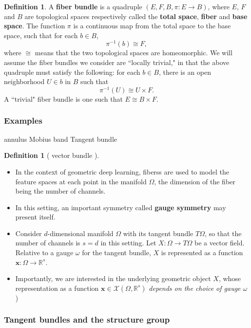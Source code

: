 \documentclass[12pt]{article}
\numberwithin{equation}{section}
\theoremstyle{definition}
\newtheorem{defn}[thm]{Definition}
\newcommand{		\R		}	{	\mathbb{R}				}
\newcommand{		\B		}	{\textbf					} %
\newcommand{		\Oh		}	{	\Omega					}
\newcommand{		\1		}	{	\bm{1}					}%
\begin{document}
\begin{defn} A \B{fiber bundle} is a quadruple $(E, F, B, \pi: E \to B)$, where $E$, $F$ and $B$ are topological spaces respectively called the \B{total space}, \B{fiber} and \B{base space}. The function $\pi$ is a continuous map from the total space to the base space, such that for each $b \in B$, 
$$
\pi^{-1} (b) \cong F,
$$
where $\cong $ means that the two topological spaces are homeomorphic. We will assume the fiber bundles we consider are ``locally trivial," in that the above quadruple must satisfy the following: for each $b \in B$, there is an open neighborhood $U \in b$ in $B$ such that 
$$
\pi ^{-1}(U) \cong U \times  F.
$$
A ``trivial" fiber bundle is one such that $E \cong B \times F$.
\end{defn}

\subsubsection*{Examples}

\subitem annulus
\subitem Mobius band
\subitem Tangent bundle

\begin{defn}[ vector bundle ]
\end{defn}

\begin{itemize}
\item In the context of geometric deep learning, fiberss are used to model the feature spaces at each point in the manifold $\Oh$, the dimension of the fiber being the number of channels. 
\item In this setting, an important symmetry called \B{gauge symmetry} may present itself.
\item Consider $d$-dimensional manifold $\Oh$ with its tangent bundle $T\Oh$, so that the number of channels is $s = d$ in this setting. Let $X: \Oh \to T\Oh$ be a vector field. Relative to a gauge $\omega$ for the tangent bundle, $X$ is represented as a function $\mathbf{x} : \Oh \to \mathbb{R}^s$.
\item Importantly, we are interested in the underlying geometric object $X$, whose representation as a function $\mathbf{x} \in \mathcal{X}(\Oh, \R^s)$ \emph{depends on the choice of gauge $\omega$})
\end{itemize}

\subsubsection*{Tangent bundles and the structure group} 
\end{document}
